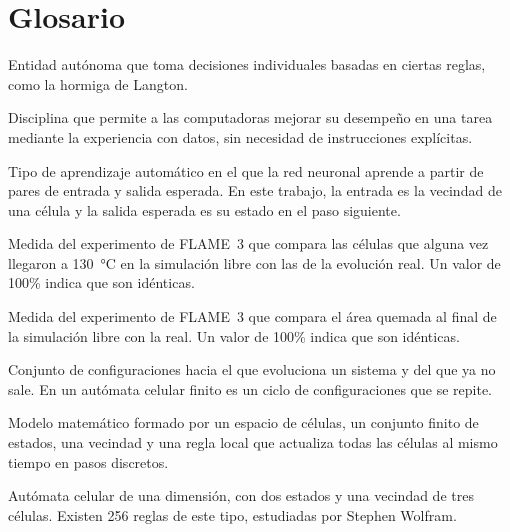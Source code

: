 \clearpage
{}
{}
\chapter*{Glosario}

\begin{description}[leftmargin=1.5em, labelindent=0pt, itemsep=4pt]

	\item[Agente] Entidad autónoma que toma decisiones individuales basadas en ciertas reglas, como la hormiga de Langton.

	\item[Aprendizaje automático] Disciplina que permite a las computadoras mejorar su desempeño en una tarea mediante la experiencia con datos, sin necesidad de instrucciones explícitas.

	\item[Aprendizaje supervisado] Tipo de aprendizaje automático en el que la red neuronal aprende a partir de pares de entrada y salida esperada. En este trabajo, la entrada es la vecindad de una célula y la salida esperada es su estado en el paso siguiente.

	\item[Área con fuego] Medida del experimento de FLAME~3 que compara las células que alguna vez llegaron a 130~°C en la simulación libre con las de la evolución real. Un valor de 100\% indica que son idénticas.

	\item[Área quemada] Medida del experimento de FLAME~3 que compara el área quemada al final de la simulación libre con la real. Un valor de 100\% indica que son idénticas.

	\item[Atractor] Conjunto de configuraciones hacia el que evoluciona un sistema y del que ya no sale. En un autómata celular finito es un ciclo de configuraciones que se repite.

	\item[Autómata celular] Modelo matemático formado por un espacio de células, un conjunto finito de estados, una vecindad y una regla local que actualiza todas las células al mismo tiempo en pasos discretos.

	\item[Autómata celular elemental] Autómata celular de una dimensión, con dos estados y una vecindad de tres células. Existen 256 reglas de este tipo, estudiadas por Stephen Wolfram.


\end{description}
